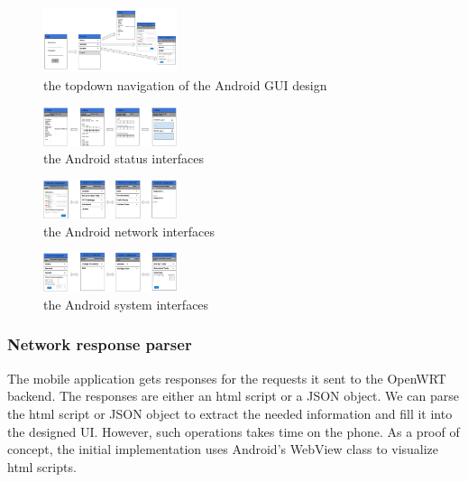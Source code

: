 	\begin{figure}[h!]
		\centering
		\includegraphics[width=0.35\textwidth]{UItopdown.png}
		\caption{the topdown navigation of the Android GUI design}
		\label{OpenWRT:androidtopdown}
	\end{figure}
	\begin{figure}[h!]
		\centering
		\includegraphics[width=0.35\textwidth]{UIstatus.png}
		\caption{the Android status interfaces}
		\label{OpenWRT:androidstatus}
	\end{figure}
	\begin{figure}[h!]
		\centering
		\includegraphics[width=0.35\textwidth]{UInetwork.png}
		\caption{the Android network interfaces}
		\label{OpenWRT:androidnetwork}
	\end{figure}
	\begin{figure}[h!]
		\centering
		\includegraphics[width=0.35\textwidth]{UIsystem.png}
		\caption{the Android system interfaces}
		\label{OpenWRT:androidsystem}
	\end{figure}

\subsubsection{Network response parser}

The mobile application gets responses for the requests it sent to the OpenWRT backend. The responses are either an html script or a JSON object. We can parse the html script or JSON object to extract the needed information and fill it into the designed UI. However, such operations takes time on the phone. As a proof of concept, the initial implementation uses Android's WebView class to visualize html scripts.

